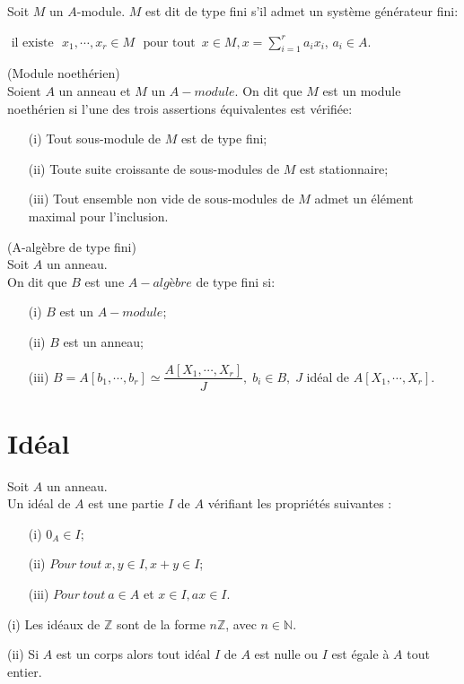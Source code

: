 \begin{madefinition}
	Soit $M$ un $A$-module. $M$ est dit de type fini s'il admet un système générateur fini:
\begin{center}
		 $\text{ il existe } \, \, x_1, \cdots ,x_r \in M$  $\text{ pour tout } \,  x \in M, x = \displaystyle \sum_{i=1}^{r}{a_i x_i}$, $a_i \in A$.
\end{center}
	 
\end{madefinition}
\begin{maproposition}(Module noethérien) \\
	Soient $A$ un anneau et $M$ un $A-module$. On dit que $M$ est un module noethérien si l'une des trois assertions équivalentes est vérifiée:
	\begin{enumerate}
		\item[(i)] Tout sous-module de $M$ est de type fini;
		\item[(ii)] Toute suite croissante de sous-modules de $M$ est stationnaire;
		\item[(iii)] Tout ensemble non vide de sous-modules de $M$ admet un élément maximal pour l'inclusion.
	\end{enumerate} 
\end{maproposition}
\begin{madefinition}(A-algèbre de type fini)\\
	Soit $A$ un anneau. \\
	On dit que $B$ est une $A-algèbre$ de type fini si:
	\begin{enumerate}
		\item[(i)] $B$ est un $A-module$;
		\item[(ii)] $B$ est un anneau;
		\item[(iii)] $B = A [b_1, \cdots, b_r] \simeq \dfrac{A[X_1, \cdots, X_r]}{J}, \; b_i \in B , \; J$ idéal de $A[X_1, \cdots, X_r]$.
	\end{enumerate}
\end{madefinition}
\section{Idéal}
\begin{madefinition}
	Soit $A$ un anneau.\\
	Un idéal de $A$ est une partie $I$ de $A$ vérifiant les propriétés suivantes : \\
	\begin{enumerate}
		\item[(i)] $0_A \in I$;
		\item[(ii)] $ Pour \ tout \ x, y \in I, x+y \in I$;
		\item[(iii)] $ Pour \ tout \ a \in A$ et $x \in I , ax \in I$.
	\end{enumerate}
\end{madefinition}
\begin{monexemple}
	\item[(i)] Les idéaux de $\mathbb{Z}$ sont de la forme $n\mathbb{Z}$, avec $n \in \mathbb{N}$.
	\item[(ii)] Si $A$ est un corps alors tout idéal $I$ de $A$ est nulle ou $I$ est égale à $A$ tout entier.
\end{monexemple}
